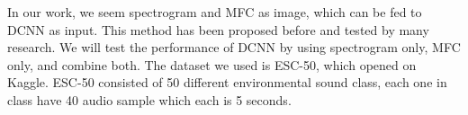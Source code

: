 In our work, we seem spectrogram and MFC as image, which can be fed to DCNN as input. This method has been proposed before and tested by many research. We will test the performance of DCNN by using spectrogram only, MFC only, and combine both. The dataset we used is ESC-50, which opened on Kaggle. ESC-50 consisted of 50 different environmental sound class, each one in class have 40 audio sample which each is 5 seconds.
